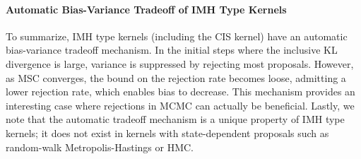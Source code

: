 \vspace{-0.1in}
\paragraph{Automatic Bias-Variance Tradeoff of IMH Type Kernels}
To summarize, IMH type kernels (including the CIS kernel) have an automatic bias-variance tradeoff mechanism.
In the initial steps where the inclusive KL divergence is large, variance is suppressed by rejecting most proposals.
However, as MSC converges, the bound on the rejection rate becomes loose, admitting a lower rejection rate, which enables bias to decrease.
This mechanism provides an interesting case where rejections in MCMC can actually be beneficial.
Lastly, we note that the automatic tradeoff mechanism is a unique property of IMH type kernels; it does not exist in kernels with state-dependent proposals such as random-walk Metropolis-Hastings or HMC.




